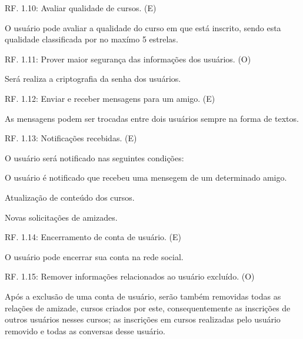 \documentclass[12pt,a4paper,onecolumn,titlepage]{article}
\begin{document}
\begin{description}
\item RF. 1.10: Avaliar qualidade de cursos. (E)
\item \qquad O usuário pode avaliar a qualidade do curso em que está inscrito, sendo esta qualidade classificada por no maxímo 5 estrelas.

\item RF. 1.11: Prover maior segurança das informações dos usuários. (O)
\item \qquad Será realiza a criptografia da senha dos usuários.

\item RF. 1.12: Enviar e receber mensagens para um amigo. (E)
\item \qquad As mensagens podem ser trocadas entre dois usuários sempre na forma de textos.



\item RF. 1.13: Notificações recebidas. (E)
\item \qquad O usuário será notificado nas seguintes condições:
\item \qquad O usuário é notificado que recebeu uma mensegem de um determinado amigo.
\item \qquad Atualização de conteúdo dos cursos.
\item \qquad Novas solicitações de amizades.

\item RF. 1.14: Encerramento de conta de usuário. (E)
\item \qquad O usuário pode encerrar sua conta na rede social.

\item RF. 1.15: Remover informações relacionados ao usuário excluído. (O)
\item \qquad Após a exclusão de uma conta de usuário, serão também removidas todas as relações de amizade, cursos criados por este, consequentemente as inscrições de outros usuários nesses cursos; as inscrições em cursos realizadas pelo usuário removido e todas as conversas desse usuário.


\end{description}
\end{document}
